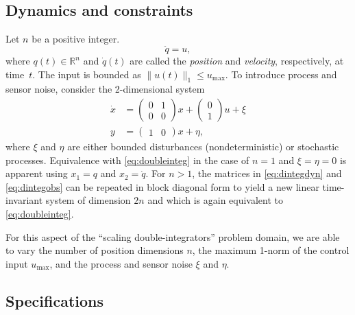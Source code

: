 \documentclass[12pt]{amsart}
\begin{document}
\subsection{Dynamics and constraints}

Let $n$ be a positive integer.
\begin{equation}\label{eq:doubleinteg}
\ddot{q} = u ,
\end{equation}
where $q(t)\in \mathbb{R}^{n}$ and $\dot{q}(t)$ are called the \textit{position}
and \textit{velocity}, respectively, at time~$t$.  The input is bounded as
$\lVert u(t) \rVert_1 \leq u_{\mathrm{max}}$.  To introduce process and sensor
noise, consider the 2-dimensional system
\begin{align}
\dot{x} &= \left(
\begin{array}{cc}
0 & 1 \\
0 & 0
\end{array}
\right) x + \left(
\begin{array}{c}
0 \\
1
\end{array}
\right) u + \xi \label{eq:dintegdyn}\\
y &= \left(
\begin{array}{cc}
1 & 0
\end{array}
\right) x + \eta \label{eq:dintegobs},
\end{align}
where $\xi$ and $\eta$ are either bounded disturbances (nondeterministic) or
stochastic processes.  Equivalence with \eqref{eq:doubleinteg} in the case of
$n=1$ and $\xi=\eta=0$ is apparent using $x_1 = q$ and $x_2 = \dot{q}$.  For $n
> 1$, the matrices in \eqref{eq:dintegdyn} and \eqref{eq:dintegobs} can be
repeated in block diagonal form to yield a new linear time-invariant system of
dimension $2n$ and which is again equivalent to \eqref{eq:doubleinteg}.

For this aspect of the ``scaling double-integrators'' problem domain, we are
able to vary the number of position dimensions $n$, the maximum 1-norm of the
control input $u_{\mathrm{max}}$, and the process and sensor noise $\xi$ and
$\eta$.

\subsection{Specifications}
\end{document}
